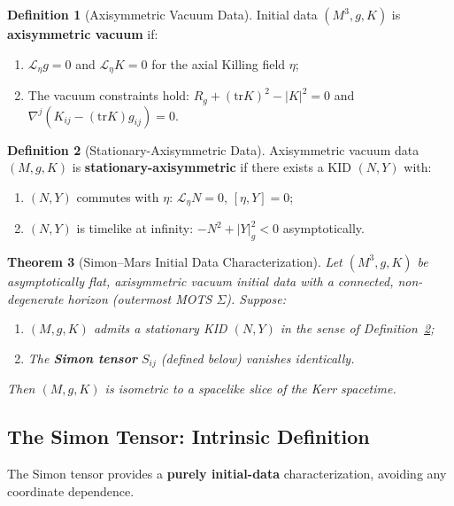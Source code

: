 \documentclass[12pt]{article}
\theoremstyle{plain}
\newtheorem{theorem}{Theorem}[section]
\theoremstyle{definition}
\newtheorem{definition}[theorem]{Definition}
\theoremstyle{remark}
\newcommand{\tr}{\mathrm{tr}}
\begin{document}
\begin{definition}[Axisymmetric Vacuum Data]\label{def:axi-vacuum}
Initial data $(M^3, g, K)$ is \textbf{axisymmetric vacuum} if:
\begin{enumerate}
    \item $\mathcal{L}_\eta g = 0$ and $\mathcal{L}_\eta K = 0$ for the axial Killing field $\eta$;
    \item The vacuum constraints hold: $R_g + (\tr K)^2 - |K|^2 = 0$ and $\nabla^j(K_{ij} - (\tr K)g_{ij}) = 0$.
\end{enumerate}
\end{definition}

\begin{definition}[Stationary-Axisymmetric Data]\label{def:stat-axi}
Axisymmetric vacuum data $(M, g, K)$ is \textbf{stationary-axisymmetric} if there exists a KID $(N, Y)$ with:
\begin{enumerate}
    \item $(N, Y)$ commutes with $\eta$: $\mathcal{L}_\eta N = 0$, $[\eta, Y] = 0$;
    \item $(N, Y)$ is timelike at infinity: $-N^2 + |Y|^2_g < 0$ asymptotically.
\end{enumerate}
\end{definition}

\begin{theorem}[Simon--Mars Initial Data Characterization]\label{thm:simon-mars-id}
Let $(M^3, g, K)$ be asymptotically flat, axisymmetric vacuum initial data with a connected, non-degenerate horizon (outermost MOTS $\Sigma$). Suppose:
\begin{enumerate}
    \item[(i)] $(M, g, K)$ admits a stationary KID $(N, Y)$ in the sense of Definition~\ref{def:stat-axi};
    \item[(ii)] The \textbf{Simon tensor} $S_{ij}$ (defined below) vanishes identically.
\end{enumerate}
Then $(M, g, K)$ is isometric to a spacelike slice of the Kerr spacetime.
\end{theorem}

\subsection{The Simon Tensor: Intrinsic Definition}

The Simon tensor provides a \textbf{purely initial-data} characterization, avoiding any coordinate dependence.
\end{document}

